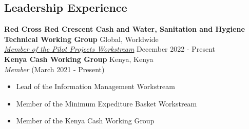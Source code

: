 \documentclass[line,margin,10pt]{res}
\begin{document}
\begin{resume}
\section{Leadership Experience}
\textbf{Red Cross Red Crescent Cash and Water, Sanitation and Hygiene Technical Working Group} \hfill Global, Worldwide\\
{\sl {\hyperref[https://sites.google.com/view/twgcashandwash/about-twg/membership#h.2r4pyiwuqh4k]{Member of the Pilot Projects Workstream}}} \hfill December 2022 - Present \\
\textbf{Kenya Cash Working Group} \hfill Kenya, Kenya\\
{\sl Member} \hfill (March 2021 - Present)
\begin{itemize} \itemsep -2pt
    \item Lead of the Information Management Workstream
    \item Member of the Minimum Expediture Basket Workstream
    \item Member of the Kenya Cash Working Group
\end{itemize}
{\vspace{-0.25cm}}


\end{resume}
\end{document}
